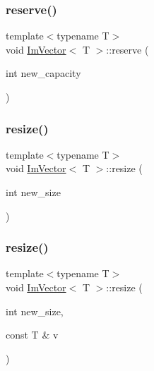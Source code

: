 \mbox{\label{class_im_vector_a0f14f5736c3372157856eebb67123b75}} 
\subsubsection{\texorpdfstring{reserve()}{reserve()}}
{\footnotesize\ttfamily template$<$typename T$>$ \\
void \mbox{\hyperlink{class_im_vector}{Im\+Vector}}$<$ T $>$\+::reserve (\begin{DoxyParamCaption}\item[{int}]{new\+\_\+capacity }\end{DoxyParamCaption})\hspace{0.3cm}{\ttfamily [inline]}}

\mbox{\label{class_im_vector_ac371dd62e56ae486b1a5038cf07eee56}} 
\subsubsection{\texorpdfstring{resize()}{resize()}\hspace{0.1cm}{\footnotesize\ttfamily [1/2]}}
{\footnotesize\ttfamily template$<$typename T$>$ \\
void \mbox{\hyperlink{class_im_vector}{Im\+Vector}}$<$ T $>$\+::resize (\begin{DoxyParamCaption}\item[{int}]{new\+\_\+size }\end{DoxyParamCaption})\hspace{0.3cm}{\ttfamily [inline]}}

\mbox{\label{class_im_vector_abe7f21776ecfb7d0214963fd8c0689f0}} 
\subsubsection{\texorpdfstring{resize()}{resize()}\hspace{0.1cm}{\footnotesize\ttfamily [2/2]}}
{\footnotesize\ttfamily template$<$typename T$>$ \\
void \mbox{\hyperlink{class_im_vector}{Im\+Vector}}$<$ T $>$\+::resize (\begin{DoxyParamCaption}\item[{int}]{new\+\_\+size,  }\item[{const T \&}]{v }\end{DoxyParamCaption})\hspace{0.3cm}{\ttfamily [inline]}}


